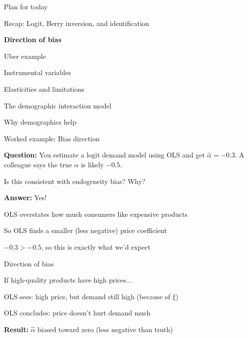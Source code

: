 \documentclass[notes,11pt, aspectratio=169]{beamer}
\newenvironment{wideitemize}{\itemize\addtolength{\itemsep}{10pt}}{\enditemize}
\newenvironment{wideenumerate}{\enumerate\addtolength{\itemsep}{10pt}}{\endenumerate}
\begin{document}
\begin{frame}{Plan for today}
  \begin{wideenumerate}
    \item Recap: Logit, Berry inversion, and identification
    \item \textbf{Direction of bias}
    \item Uber example
    \item Instrumental variables
    \item Elasticities and limitations
    \item The demographic interaction model
    \item Why demographics help
  \end{wideenumerate}
\end{frame}

\begin{frame}{Worked example: Bias direction}
	\begin{wideitemize}
		\item \textbf{Question:} You estimate a logit demand model using OLS and get $\hat{\alpha} = -0.3$. A colleague says the true $\alpha$ is likely $-0.5$.
		\item Is this consistent with endogeneity bias? Why?
		\pause
		\item \textbf{Answer:} Yes!
		\begin{wideitemize}
			\vspace{5pt}
			\item OLS overstates how much consumers like expensive products
			\item So OLS finds a smaller (less negative) price coefficient
			\item $-0.3 > -0.5$, so this is exactly what we'd expect
		\end{wideitemize}
	\end{wideitemize}
\end{frame}

\begin{frame}{Direction of bias}
	\begin{wideitemize}
		\item If high-quality products have high prices...
		\item OLS sees: high price, but demand still high (because of $\xi$)
		\item OLS concludes: price doesn't hurt demand much
		\item \textbf{Result:} $\hat{\alpha}$ biased toward zero (less negative than truth)
	\end{wideitemize}
\end{frame}
\end{document}
